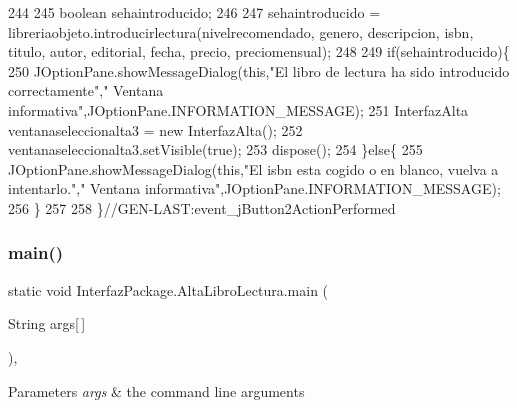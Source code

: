 \begin{DoxyCode}
244         
245         \textcolor{keywordtype}{boolean} sehaintroducido;
246         
247         sehaintroducido = libreriaobjeto.introducirlectura(nivelrecomendado, genero, descripcion, isbn, 
      titulo, autor, editorial, fecha, precio, preciomensual);
248         
249         \textcolor{keywordflow}{if}(sehaintroducido)\{
250             JOptionPane.showMessageDialog(\textcolor{keyword}{this},\textcolor{stringliteral}{"El libro de lectura ha sido introducido correctamente"},\textcolor{stringliteral}{"
      Ventana informativa"},JOptionPane.INFORMATION\_MESSAGE);
251             InterfazAlta ventanaseleccionalta3 = \textcolor{keyword}{new} InterfazAlta();
252             ventanaseleccionalta3.setVisible(\textcolor{keyword}{true});
253             dispose();
254         \}\textcolor{keywordflow}{else}\{
255             JOptionPane.showMessageDialog(\textcolor{keyword}{this},\textcolor{stringliteral}{"El isbn esta cogido o en blanco, vuelva a intentarlo."},\textcolor{stringliteral}{"
      Ventana informativa"},JOptionPane.INFORMATION\_MESSAGE);
256         \}
257         
258     \}\textcolor{comment}{//GEN-LAST:event\_jButton2ActionPerformed}
\end{DoxyCode}
\mbox{\label{class_interfaz_package_1_1_alta_libro_lectura_a1b635a9d4b17d8138049a4384963a884}} 
\subsubsection{\texorpdfstring{main()}{main()}}
{\footnotesize\ttfamily static void Interfaz\+Package.\+Alta\+Libro\+Lectura.\+main (\begin{DoxyParamCaption}\item[{String}]{args\mbox{[}$\,$\mbox{]} }\end{DoxyParamCaption})\hspace{0.3cm}{\ttfamily [inline]}, {\ttfamily [static]}}


\begin{DoxyParams}{Parameters}
{\em args} & the command line arguments \\
\hline
\end{DoxyParams}

